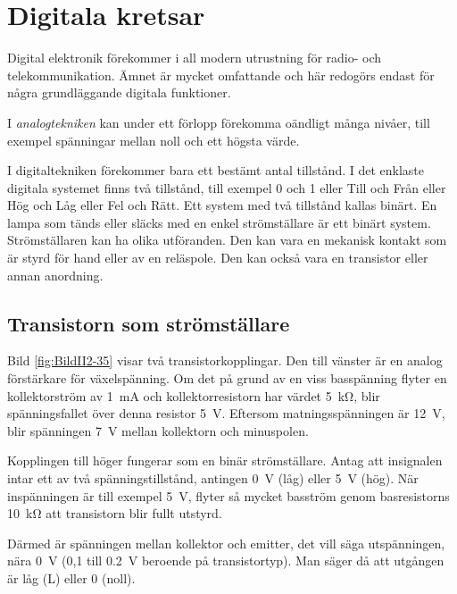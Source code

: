 \section{Digitala kretsar}
\label{digitala kretsar}

Digital elektronik förekommer i all modern utrustning för radio- och
telekommunikation.
Ämnet är mycket omfattande och här redogörs endast för några grundläggande
digitala funktioner.

I \emph{analogtekniken} kan under ett förlopp förekomma oändligt många nivåer,
till exempel spänningar mellan noll och ett högsta värde.

I digitaltekniken förekommer bara ett bestämt antal tillstånd.
I det enklaste digitala systemet finns två tillstånd, till exempel 0 och 1 eller
Till och Från eller Hög och Låg eller Fel och Rätt.
Ett system med två tillstånd kallas binärt.
En lampa som tänds eller släcks med en enkel strömställare är ett binärt system.
Strömställaren kan ha olika utföranden.
Den kan vara en mekanisk kontakt som är styrd för hand eller av en reläspole.
Den kan också vara en transistor eller annan anordning.

\subsection{Transistorn som strömställare}
\label{transistor_strömställare}


Bild \ref{fig:BildII2-35} visar två transistorkopplingar.
Den till vänster är en analog förstärkare för växelspänning.
Om det på grund av en viss basspänning flyter en kollektorström av
\SI{1}{\milli\ampere} och kollektorresistorn har värdet \SI{5}{\kilo\ohm}, blir
spänningsfallet över denna resistor \SI{5}{\volt}.
Eftersom matningsspänningen är \SI{12}{\volt}, blir spänningen \SI{7}{\volt}
mellan kollektorn och minuspolen.

Kopplingen till höger fungerar som en binär strömställare.
Antag att insignalen intar ett av två spänningstillstånd, antingen
\SI{0}{\volt} (låg) eller \SI{5}{\volt} (hög).
När inspänningen är till exempel \SI{5}{\volt}, flyter så mycket basström genom
basresistorns \SI{10}{\kilo\ohm} att transistorn blir fullt utstyrd.

Därmed är spänningen mellan kollektor och emitter, det vill säga utspänningen,
nära \SI{0}{\volt} (0,1 till \SI{0,2}{\volt} beroende på transistortyp).
Man säger då att utgången är låg (L) eller 0 (noll).

